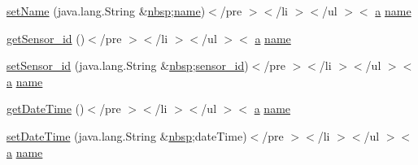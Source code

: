 \begin{DoxyCompactItemize}
\item 
\hyperlink{_sensor_alerts_8html_af95e3254120d903b8d0b3b97e85feb25}{set\-Name} (java.\-lang.\-String \&\hyperlink{_tools_8html_aef915316f784c9063d942974538301a6}{nbsp};\hyperlink{_cloudia_d_b_8html_ab74e6bf80237ddc4109968cedc58c151}{name})$<$/pre $>$$<$/li $>$$<$/ul $>$$<$ \hyperlink{style_8css_a5e8981582017bb8b84c21f148345d1f7}{a} \hyperlink{_cloudia_d_b_8html_ab74e6bf80237ddc4109968cedc58c151}{name}
\item 
\hyperlink{_sensor_alerts_8html_af12a109381d109351773fc09766f6555}{get\-Sensor\-\_\-id} ()$<$/pre $>$$<$/li $>$$<$/ul $>$$<$ \hyperlink{style_8css_a5e8981582017bb8b84c21f148345d1f7}{a} \hyperlink{_cloudia_d_b_8html_ab74e6bf80237ddc4109968cedc58c151}{name}
\item 
\hyperlink{_sensor_alerts_8html_a6d995475674c80544a1c6be4aadcebb4}{set\-Sensor\-\_\-id} (java.\-lang.\-String \&\hyperlink{_tools_8html_aef915316f784c9063d942974538301a6}{nbsp};\hyperlink{_my_s_q_l_connector_8measure_8html_a48a4081a48bf69abc4ba5d704ec33919}{sensor\-\_\-id})$<$/pre $>$$<$/li $>$$<$/ul $>$$<$ \hyperlink{style_8css_a5e8981582017bb8b84c21f148345d1f7}{a} \hyperlink{_cloudia_d_b_8html_ab74e6bf80237ddc4109968cedc58c151}{name}
\item 
\hyperlink{_sensor_alerts_8html_a4c732102bfde8d1c1e681bb84f13be82}{get\-Date\-Time} ()$<$/pre $>$$<$/li $>$$<$/ul $>$$<$ \hyperlink{style_8css_a5e8981582017bb8b84c21f148345d1f7}{a} \hyperlink{_cloudia_d_b_8html_ab74e6bf80237ddc4109968cedc58c151}{name}
\item 
\hyperlink{_sensor_alerts_8html_a19795cf4474ab7b441880751f2c850c2}{set\-Date\-Time} (java.\-lang.\-String \&\hyperlink{_tools_8html_aef915316f784c9063d942974538301a6}{nbsp};date\-Time)$<$/pre $>$$<$/li $>$$<$/ul $>$$<$ \hyperlink{style_8css_a5e8981582017bb8b84c21f148345d1f7}{a} \hyperlink{_cloudia_d_b_8html_ab74e6bf80237ddc4109968cedc58c151}{name}
\end{DoxyCompactItemize}

